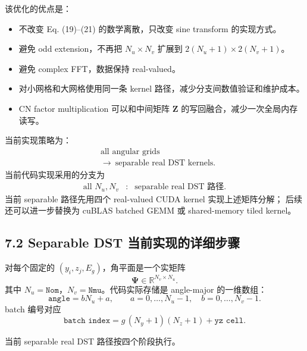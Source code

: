 \documentclass[11pt,a4paper]{ctexart}
\begin{document}
该优化的优点是：
\begin{itemize}
\item 不改变 Eq. (19)--(21) 的数学离散，只改变 sine transform 的实现方式。
\item 避免 odd extension，不再把 \(N_u\times N_v\) 扩展到 \(2(N_u+1)\times2(N_v+1)\)。
\item 避免 complex FFT，数据保持 real-valued。
\item 对小网格和大网格使用同一条 kernel 路径，减少分支间数值验证和维护成本。
\item CN factor multiplication 可以和中间矩阵 \(\mathbf Z\) 的写回融合，减少一次全局内存读写。
\end{itemize}

当前实现策略为：
\begin{equation}
\begin{aligned}
  &\text{all angular grids}\\
  &\rightarrow\ \text{separable real DST kernels}.
\end{aligned}
\end{equation}
当前代码实现采用的分支为
\begin{equation}
\begin{array}{lll}
\text{all }N_u,N_v &:& \text{separable real DST 路径}.
\end{array}
\end{equation}
当前 separable 路径先用四个 real-valued CUDA kernel 实现上述矩阵分解；
后续还可以进一步替换为 cuBLAS batched GEMM 或 shared-memory tiled kernel。

\subsection*{7.2 Separable DST 当前实现的详细步骤}

对每个固定的 \((y_i,z_j,E_g)\)，角平面是一个实矩阵
\begin{equation}
  \mathbf\Psi
  \in
  \mathbb R^{N_v\times N_u}.
\end{equation}
其中 \(N_u=\texttt{Nom}\)，\(N_v=\texttt{Nmu}\)。代码实际存储是 angle-major 的一维数组：
\begin{equation}
  \texttt{angle}=bN_u+a,
  \qquad
  a=0,\ldots,N_u-1,\quad b=0,\ldots,N_v-1.
\end{equation}
batch 编号对应
\begin{equation}
  \texttt{batch index}
  =
  g\,(N_y+1)(N_z+1)+\texttt{yz cell}.
\end{equation}

当前 separable real DST 路径按四个阶段执行。
\end{document}
